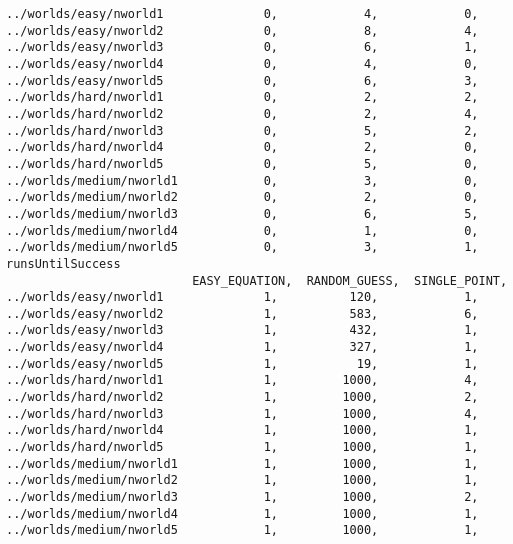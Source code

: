 \documentclass[british]{article}
\begin{document}
\begin{lstlisting}
../worlds/easy/nworld1              0,            4,            0,
../worlds/easy/nworld2              0,            8,            4,
../worlds/easy/nworld3              0,            6,            1,
../worlds/easy/nworld4              0,            4,            0,
../worlds/easy/nworld5              0,            6,            3,
../worlds/hard/nworld1              0,            2,            2,
../worlds/hard/nworld2              0,            2,            4,
../worlds/hard/nworld3              0,            5,            2,
../worlds/hard/nworld4              0,            2,            0,
../worlds/hard/nworld5              0,            5,            0,
../worlds/medium/nworld1            0,            3,            0,
../worlds/medium/nworld2            0,            2,            0,
../worlds/medium/nworld3            0,            6,            5,
../worlds/medium/nworld4            0,            1,            0,
../worlds/medium/nworld5            0,            3,            1,
runsUntilSuccess
                          EASY_EQUATION,  RANDOM_GUESS,  SINGLE_POINT,
../worlds/easy/nworld1              1,          120,            1,
../worlds/easy/nworld2              1,          583,            6,
../worlds/easy/nworld3              1,          432,            1,
../worlds/easy/nworld4              1,          327,            1,
../worlds/easy/nworld5              1,           19,            1,
../worlds/hard/nworld1              1,         1000,            4,
../worlds/hard/nworld2              1,         1000,            2,
../worlds/hard/nworld3              1,         1000,            4,
../worlds/hard/nworld4              1,         1000,            1,
../worlds/hard/nworld5              1,         1000,            1,
../worlds/medium/nworld1            1,         1000,            1,
../worlds/medium/nworld2            1,         1000,            1,
../worlds/medium/nworld3            1,         1000,            2,
../worlds/medium/nworld4            1,         1000,            1,
../worlds/medium/nworld5            1,         1000,            1,
\end{lstlisting}
\end{document}
